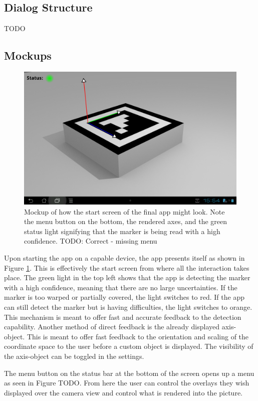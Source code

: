 \subsection{Dialog Structure}

TODO

\subsection{Mockups}

\begin{figure}
	\centering
	\includegraphics[width=15cm]{images/start_mockup.png}
	\caption[Start screen mockup.]{Mockup of how the start screen of the final app might look. Note the menu button on the bottom, the rendered axes, and the green status light signifying that the marker is being read with a high confidence. TODO: Correct - missing menu}
	\label{fig:start_mockup}
\end{figure}

Upon starting the app on a capable device, the app presents itself as shown in Figure \ref{fig:start_mockup}.
This is effectively the start screen from where all the interaction takes place.
The green light in the top left shows that the app is detecting the marker with a high confidence, meaning that there are no large uncertainties.
If the marker is too warped or partially covered, the light switches to red.
If the app can still detect the marker but is having difficulties, the light switches to orange.
This mechanism is meant to offer fast and accurate feedback to the detection capability.
Another method of direct feedback is the already displayed axis-object.
This is meant to offer fast feedback to the orientation and scaling of the coordinate space to the user before a custom object is displayed.
The visibility of the axis-object can be toggled in the settings.

The menu button on the status bar at the bottom of the screen opens up a menu as seen in Figure TODO.
From here the user can control the overlays they wish displayed over the camera view and control what is rendered into the picture.
